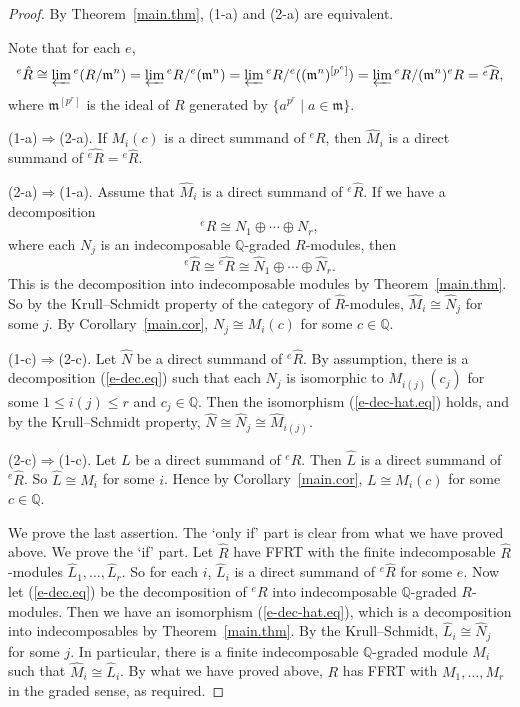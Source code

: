 \documentclass[11pt,leqno]{article}
\theoremstyle{definition}
\theoremstyle{remark}
\theoremstyle{remark}
\newcommand{\fm}{\ensuremath{\mathfrak m}}
\def\fm{\mathfrak{m}}
\def\QQ{{\mathbb{Q}}}
\let\projlim\varprojlim
\begin{document}
\begin{proof}
  By Theorem~\ref{main.thm}, (1-a) and (2-a) are equivalent.

  Note that for each $e$,
  \[
    {}^e\hat R\cong\projlim {}^e(R/\fm^n)
    =
    \projlim {}^eR/{}^e(\fm^n)
    =
    \projlim {}^eR/{}^e((\fm^n)^{[p^e]})
    =
    \projlim {}^eR / (\fm^n ){}^eR=\widehat{{}^eR},
    \]
    where $\fm^{[p^r]}$ is the ideal of $R$ generated by $\{a^{p^r}\mid a\in \fm\}$.

    (1-a)$\Rightarrow$(2-a).
    If $M_i(c)$ is a direct summand of ${}^eR$, then $\hat M_i$ is a direct summand of
    $\widehat{{}^e R}={}^e \hat R$.
    
    (2-a)$\Rightarrow$(1-a).
    Assume that $\hat M_i$ is a direct summand of ${}^e\hat R$.
    If we have a decomposition
    \begin{equation}\label{e-dec.eq}
      {}^eR \cong N_1\oplus\cdots\oplus N_r,
    \end{equation}
      where each $N_j$ is an indecomposable $\QQ$-graded $R$-modules,
      then
      \begin{equation}\label{e-dec-hat.eq}
        {}^e\hat R\cong\widehat{{}^eR}\cong \hat N_1\oplus\cdots\oplus \hat N_r.
      \end{equation}
      This is the decomposition into indecomposable modules by Theorem~\ref{main.thm}.
      So by the Krull--Schmidt property of the category of $\hat R$-modules,
      $\hat M_i\cong \hat N_j$ for some $j$.
      By Corollary~\ref{main.cor}, $N_j\cong M_i(c)$ for some $c\in\QQ$.

      (1-c)$\Rightarrow$(2-c).
      Let $\hat N$ be a direct summand of ${}^e\hat R$.
      By assumption, there is a decomposition (\ref{e-dec.eq}) such that each $N_j$ is
      isomorphic to $M_{i(j)}(c_j)$ for some $1\leq i(j)\leq r$ and $c_j\in\QQ$.
      Then the isomorphism (\ref{e-dec-hat.eq}) holds, and by the Krull--Schmidt property,
      $\hat N\cong \hat N_j\cong \hat M_{i(j)}$.

      (2-c)$\Rightarrow$(1-c).
      Let $L$ be a direct summand of ${}^eR$.
      Then $\hat L$ is a direct summand of ${}^e\hat R$.
      So $\hat L\cong \hat M_i$ for some $i$.
      Hence by Corollary~\ref{main.cor}, $L\cong M_i(c)$ for some $c\in\QQ$.

      We prove the last assertion.
      The \lq only if' part is clear from what we have proved above.
      We prove the \lq if' part.
      Let $\hat R$ have FFRT with the finite indecomposable $\hat R$-modules
      $\hat L_1,\ldots,\hat L_r$.
      So for each $i$, $\hat L_i$ is a direct summand of ${}^e\hat R$ for some $e$.
      Now let (\ref{e-dec.eq}) be the decomposition of ${}^eR$ into indecomposable $\QQ$-graded $R$-modules.
      Then we have an isomorphism (\ref{e-dec-hat.eq}), which is a decomposition into indecomposables by
      Theorem~\ref{main.thm}.
      By the Krull--Schmidt, $\hat L_i\cong \hat N_j$ for some $j$.
      In particular, there is a finite indecomposable $\QQ$-graded module $M_i$ such that $\hat M_i\cong \hat L_i$.
      By what we have proved above, $R$ has FFRT with $M_1,\ldots,M_r$ in the
      graded sense, as required.
\end{proof}
\end{document}
